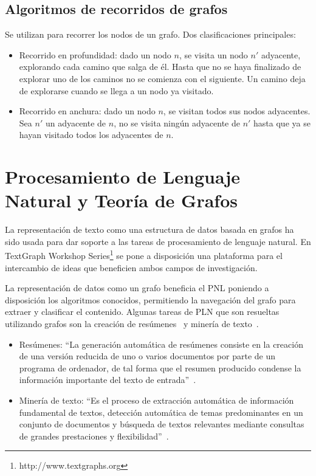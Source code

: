 \subsection{Algoritmos de recorridos de grafos}
Se utilizan para recorrer los nodos de un grafo. Dos clasificaciones principales:
\begin{itemize}
    \item Recorrido en profundidad: dado un nodo $n$, se visita un nodo $n'$ adyacente, explorando cada camino que salga de él. Hasta que no se haya finalizado de explorar uno de los caminos no se comienza con el siguiente. Un camino deja de explorarse cuando se llega a un nodo ya visitado. 
    \item Recorrido en anchura: dado un nodo $n$, se visitan todos sus nodos adyacentes. Sea $n'$ un adyacente de $n$, no se visita ningún adyacente de $n'$ hasta que ya se hayan visitado todos los adyacentes de $n$. 
\end{itemize}

\section{Procesamiento de Lenguaje Natural y Teoría de Grafos}
La representación de texto como una estructura de datos basada en grafos ha sido usada para dar soporte a las tareas de procesamiento de lenguaje natural. En TextGraph Workshop Series\footnote{http://www.textgraphs.org} se pone a disposición una plataforma para el intercambio de ideas que beneficien ambos campos de investigación. 

La representación de datos como un grafo beneficia el PNL poniendo a disposición los algoritmos conocidos, permitiendo la navegación del grafo para extraer y clasificar el contenido. Algunas tareas de PLN que son resueltas utilizando grafos son la creación de resúmenes~\cite{mihalcea2004graph}\cite{erkan2004lexrank} y minería de texto~\cite{Jin:2007:GTR:1244002.1244182}\cite{beliga2015overview}.

\begin{itemize}
    \item Resúmenes: ``La generación automática de resúmenes consiste en la creación de una versión reducida de uno o varios documentos por parte de un programa de ordenador, de tal forma que el resumen producido condense la información importante del texto de entrada''~\cite{plaza2011uso}.
    \item Minería de texto: ``Es el proceso de extracción automática de información fundamental de textos,  detección  automática  de temas  predominantes en un conjunto de documentos y búsqueda de textos relevantes mediante consultas de grandes prestaciones y flexibilidad''~\cite{brun2004articulo}.
\end{itemize}

